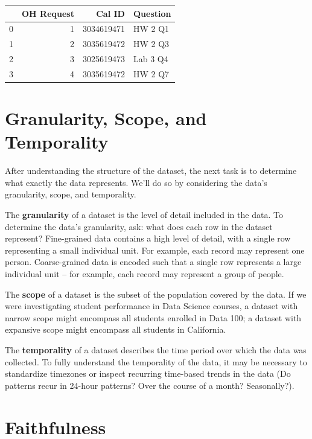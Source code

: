 \documentclass[
  letterpaper,
  DIV=11,
  numbers=noendperiod]{scrreprt}
\begin{document}
\begin{tabular}{lrrl}
\toprule
{} &  OH Request &      Cal ID &  Question \\
\midrule
0 &           1 &  3034619471 &   HW 2 Q1 \\
1 &           2 &  3035619472 &   HW 2 Q3 \\
2 &           3 &  3025619473 &  Lab 3 Q4 \\
3 &           4 &  3035619472 &   HW 2 Q7 \\
\bottomrule
\end{tabular}

\hypertarget{granularity-scope-and-temporality}{%
\section{Granularity, Scope, and
Temporality}\label{granularity-scope-and-temporality}}

After understanding the structure of the dataset, the next task is to
determine what exactly the data represents. We'll do so by considering
the data's granularity, scope, and temporality.

The \textbf{granularity} of a dataset is the level of detail included in
the data. To determine the data's granularity, ask: what does each row
in the dataset represent? Fine-grained data contains a high level of
detail, with a single row representing a small individual unit. For
example, each record may represent one person. Coarse-grained data is
encoded such that a single row represents a large individual unit -- for
example, each record may represent a group of people.

The \textbf{scope} of a dataset is the subset of the population covered
by the data. If we were investigating student performance in Data
Science courses, a dataset with narrow scope might encompass all
students enrolled in Data 100; a dataset with expansive scope might
encompass all students in California.

The \textbf{temporality} of a dataset describes the time period over
which the data was collected. To fully understand the temporality of the
data, it may be necessary to standardize timezones or inspect recurring
time-based trends in the data (Do patterns recur in 24-hour patterns?
Over the course of a month? Seasonally?).

\hypertarget{faithfulness}{%
\section{Faithfulness}\label{faithfulness}}
\end{document}
